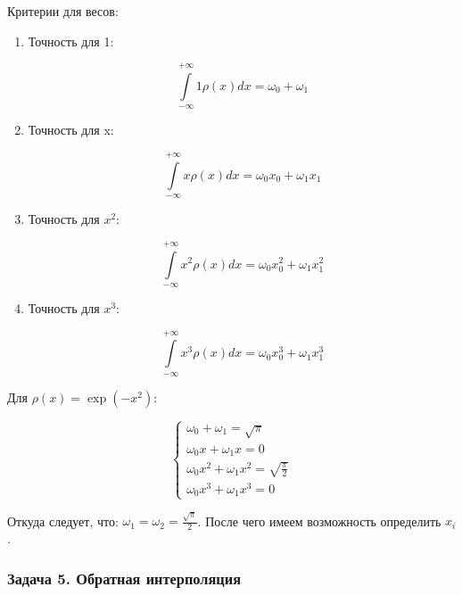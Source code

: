 \documentclass[10pt,a4paper]{article}
\begin{document}
	Критерии для весов:
	
	\begin{enumerate}
		\item Точность для 1:
		
		\begin{equation}
			\int\limits_{-\infty}^{+\infty}1\rho\left(x\right)dx = \omega_{0} + 
			\omega_{1}
		\end{equation}
		
		\item Точность для x:
		
		\begin{equation}
			\int\limits_{-\infty}^{+\infty}x\rho\left(x\right)dx = \omega_{0}
			x_{0} + \omega_{1}x_{1}
		\end{equation}
		
		\item Точность для $x^{2}$:
		
		\begin{equation}
			\int\limits_{-\infty}^{+\infty}x^{2}\rho\left(x\right)dx =
			 \omega_{0}x_{0}^{2} + \omega_{1}x_{1}^{2}
		\end{equation}
		
		
		
		\item Точность для $x^{3}$:
		
		\begin{equation}
			\int\limits_{-\infty}^{+\infty}x^{3}\rho\left(x\right)dx =
			 \omega_{0}x_{0}^{3} + \omega_{1}x_{1}^{3}
		\end{equation}
	\end{enumerate}
	
	Для $\rho\left(x\right) = \exp\left(-x^{2}\right):$
	
	\begin{equation}
		\begin{cases}
			\omega_{0} + \omega_{1} = \sqrt{\pi}
			\\
			\omega_{0}x + \omega_{1}x = 0
			\\
			\omega_{0}x^{2} + \omega_{1}x^{2}= \sqrt{\frac{\pi}{2}}
			\\
			\omega_{0}x^{3} + \omega_{1}x^{3}= 0
		\end{cases}
	\end{equation}
	
	Откуда следует, что: $\omega_{1} = \omega_{2} = \frac{\sqrt{\pi}}{2}$. 
	После чего имеем возможность определить $x_{i}$.
	
	\subsubsection{Задача 5. Обратная интерполяция}
	
\end{document}
